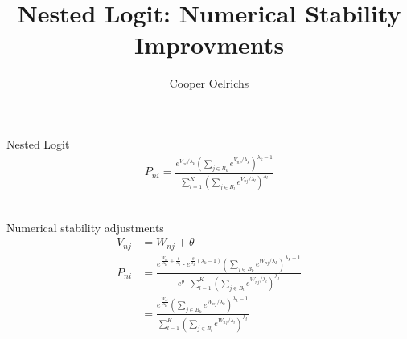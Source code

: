 \documentclass[20pt]{extarticle}
\begin{document}
\title{Nested Logit: Numerical Stability Improvments}
\author{Cooper Oelrichs}

Nested Logit
\begin{align}
  P_{ni}=
  \frac{e^{V_{ni}/\lambda_{k}}
  \left(\sum_{j\in B_{k}}e^{V_{nj}/\lambda_{k}}\right)
  ^{\lambda_{k}-1}}
  {\sum_{l=1}^{K}\left(\sum_{j\in B_{l}}
  e^{V_{nj}/\lambda_{l}}\right)^{\lambda_{l}}}
\end{align}

\\
Numerical stability adjustments
\begin{align}
  V_{nj} &= W_{nj} + \theta
  \\
  P_{ni} &=
  \frac{
    e^{ \frac{W_{ni}}{\lambda_{k}} + \frac{\theta}{\lambda_{k}} }
    \cdot
    e^{ \frac{\theta}{\lambda_{k}} (\lambda_{k}-1) }
    \left(\sum_{j\in B_{k}}e^{W_{nj}/\lambda_{k}}\right)
    ^{\lambda_{k}-1}
  }
  {
    e^\theta \cdot
    {\sum_{l=1}^{K}\left(\sum_{j\in B_{l}}
    e^{W_{nj}/\lambda_{l}}\right)^{\lambda_{l}}}
  }
  \\
  &= \frac{
      e^{ \frac{W_{ni}}{\lambda_{k}} }
      \left(\sum_{j\in B_{k}}e^{W_{nj}/\lambda_{k}}\right)
      ^{\lambda_{k}-1}
    }
    {
      {\sum_{l=1}^{K}\left(\sum_{j\in B_{l}}
      e^{W_{nj}/\lambda_{l}}\right)^{\lambda_{l}}}
    }
\end{align}
\end{document}
